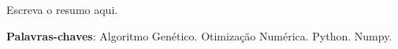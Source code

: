 Escreva o resumo aqui.

\vspace{\onelineskip}\noindent
\textbf{Palavras-chaves}: Algoritmo Genético. Otimização Numérica. Python. Numpy.